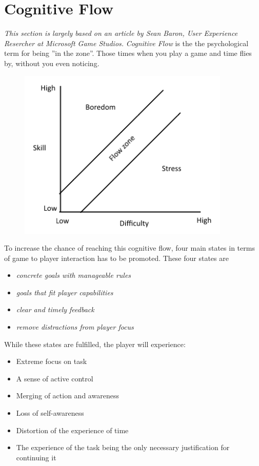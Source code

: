 \section{Cognitive Flow}\label{gamedesign:cognitiveflow}
\emph{This section is largely based on an article by Sean Baron, User Experience Resercher at Microsoft Game Studios\cite{baron}.}
\emph{Cognitive Flow} is the the psychological term for being ''in the zone''. Those times when you play a game and time flies by, without you even noticing. 

\begin{figure}
\includegraphics{figures/gamedesign/flowZone}
\end{figure}

To increase the chance of reaching this cognitive flow, four main states in terms of game to player interaction has to be promoted. 
These four states are 
\begin{itemize}
\item \emph{concrete goals with manageable rules}
\item \emph{goals that fit player capabilities}
\item \emph{clear and timely feedback}
\item \emph{remove distractions from player focus}
\end{itemize} While these states are fulfilled, the player will experience:

\begin{itemize}
\item Extreme focus on task
\item A sense of active control
\item Merging of action and awareness
\item Loss of self-awareness
\item Distortion of the experience of time
\item The experience of the task being the only necessary justification for continuing it
\end{itemize}

